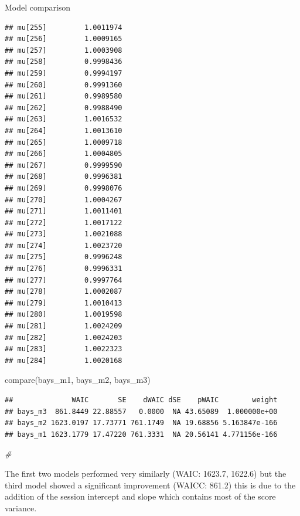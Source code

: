 \documentclass[
  ignorenonframetext,
]{beamer}
\newenvironment{Shaded}{\begin{snugshade}}{\end{snugshade}}
\newcommand{\CommentTok}[1]{\textcolor[rgb]{0.56,0.35,0.01}{\textit{#1}}}
\newcommand{\FunctionTok}[1]{\textcolor[rgb]{0.00,0.00,0.00}{#1}}
\newcommand{\NormalTok}[1]{#1}
\begin{document}
\begin{frame}[fragile]{Model comparison}
\begin{verbatim}
## mu[255]         1.0011974
## mu[256]         1.0009165
## mu[257]         1.0003908
## mu[258]         0.9998436
## mu[259]         0.9994197
## mu[260]         0.9991360
## mu[261]         0.9989580
## mu[262]         0.9988490
## mu[263]         1.0016532
## mu[264]         1.0013610
## mu[265]         1.0009718
## mu[266]         1.0004805
## mu[267]         0.9999590
## mu[268]         0.9996381
## mu[269]         0.9998076
## mu[270]         1.0004267
## mu[271]         1.0011401
## mu[272]         1.0017122
## mu[273]         1.0021088
## mu[274]         1.0023720
## mu[275]         0.9996248
## mu[276]         0.9996331
## mu[277]         0.9997764
## mu[278]         1.0002087
## mu[279]         1.0010413
## mu[280]         1.0019598
## mu[281]         1.0024209
## mu[282]         1.0024203
## mu[283]         1.0022323
## mu[284]         1.0020168
\end{verbatim}

\begin{Shaded}
\begin{Highlighting}[]
\FunctionTok{compare}\NormalTok{(bays\_m1, bays\_m2, bays\_m3)}
\end{Highlighting}
\end{Shaded}

\begin{verbatim}
##              WAIC       SE    dWAIC dSE    pWAIC        weight
## bays_m3  861.8449 22.88557   0.0000  NA 43.65089  1.000000e+00
## bays_m2 1623.0197 17.73771 761.1749  NA 19.68856 5.163847e-166
## bays_m1 1623.1779 17.47220 761.3331  NA 20.56141 4.771156e-166
\end{verbatim}

\begin{Shaded}
\begin{Highlighting}[]
\CommentTok{\#}
\end{Highlighting}
\end{Shaded}

The first two models performed very similarly (WAIC: 1623.7, 1622.6) but
the third model showed a significant improvement (WAICC: 861.2) this is
due to the addition of the session intercept and slope which contains
most of the score variance.
\end{frame}
\end{document}
